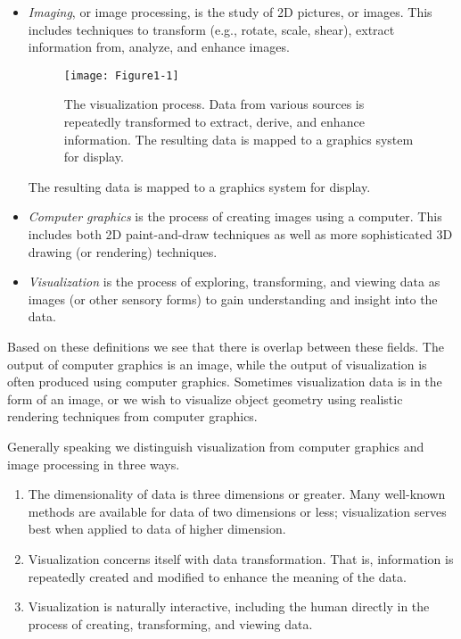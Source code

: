 \begin{itemize}
  \item  \emph{Imaging}, or image processing, is the study of 2D pictures, or images. This includes techniques to transform (e.g., rotate, scale, shear), extract information from, analyze, and enhance images.
\begin{figure}[ht]
  \centering
  \texttt{[image: Figure1-1]}\\
  \caption{The visualization process. Data from various sources is repeatedly transformed to extract, derive, and enhance information. The resulting data is mapped to a graphics system for display.}\label{fig:Figure1-1}
\end{figure}

The resulting data is mapped to a graphics system for display.

  \item  \emph{Computer graphics} is the process of creating images using a computer. This includes both 2D paint-and-draw techniques as well as more sophisticated 3D drawing (or rendering) techniques.

  \item \emph{Visualization} is the process of exploring, transforming, and viewing data as images (or other sensory forms) to gain understanding and insight into the data.
\end{itemize}

Based on these definitions we see that there is overlap between these fields. The output of computer graphics is an image, while the output of visualization is often produced using computer graphics. Sometimes visualization data is in the form of an image, or we wish to visualize object geometry using realistic rendering techniques from computer graphics.

Generally speaking we distinguish visualization from computer graphics and image processing in three ways.

\begin{enumerate}
  \item The dimensionality of data is three dimensions or greater. Many well-known methods are available for data of two dimensions or less; visualization serves best when applied to data of higher dimension.

  \item Visualization concerns itself with data transformation. That is, information is repeatedly created and modified to enhance the meaning of the data.

  \item Visualization is naturally interactive, including the human directly in the process of creating, transforming, and viewing data.
\end{enumerate}


